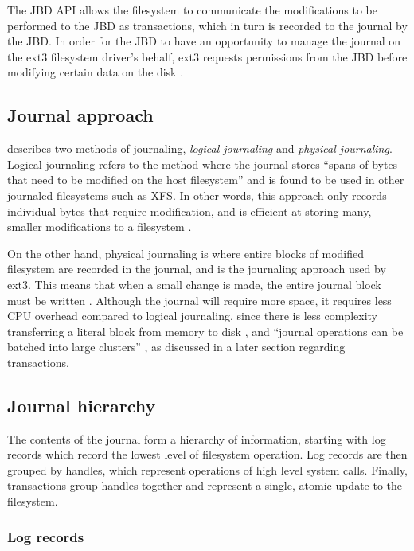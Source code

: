 The JBD API allows the filesystem to communicate the modifications to be performed to the JBD as transactions, which in turn is recorded to the journal by the JBD. In order for the JBD to have an opportunity to manage the journal on the ext3 filesystem driver's behalf, ext3 requests permissions from the JBD before modifying certain data on the disk \citep{Robbins2001a}.

\subsection{Journal approach}

\citet[p. 3]{Robbins2001a} describes two methods of journaling, \emph{logical journaling} and \emph{physical journaling}. Logical journaling refers to the method where the journal stores ``spans of bytes that need to be modified on the host filesystem'' and is found to be used in other journaled filesystems such as XFS. In other words, this approach only records individual bytes that require modification, and is efficient at storing many, smaller modifications to a filesystem \citep{Robbins2001a}.

On the other hand, physical journaling is where entire blocks of modified filesystem are recorded in the journal, and is the journaling approach used by ext3. This means that when a small change is made, the entire journal block must be written \citep{Bovet2006, Robbins2001a}. Although the journal will require more space, it requires less CPU overhead compared to logical journaling, since there is less complexity transferring a literal block from memory to disk \citep{Robbins2001a}, and ``journal operations can be batched into large clusters'' \citep[p. 55]{Galli2001}, as discussed in a later section regarding transactions.

\subsection{Journal hierarchy}

The contents of the journal form a hierarchy of information, starting with log records which record the lowest level of filesystem operation. Log records are then grouped by handles, which represent operations of high level system calls. Finally, transactions group handles together and represent a single, atomic update to the filesystem.

\subsubsection{Log records}

